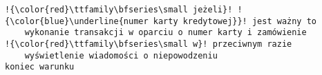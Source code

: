 \documentclass[a4paper,12pt]{book}
\begin{document}
\begin{lstlisting}
!{\color{red}\ttfamily\bfseries\small jeżeli}! !{\color{blue}\underline{numer karty kredytowej}}! jest ważny to
	wykonanie transakcji w oparciu o numer karty i zamówienie
!{\color{red}\ttfamily\bfseries\small w}! przeciwnym razie
	wyświetlenie wiadomości o niepowodzeniu
koniec warunku
\end{lstlisting}
\end{document}
